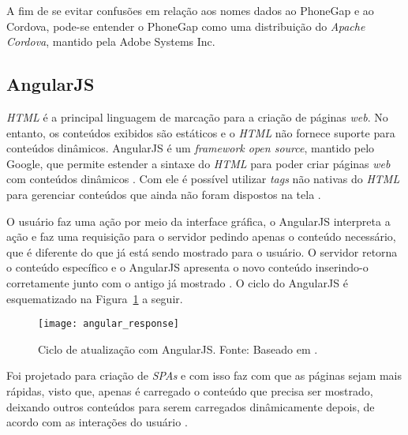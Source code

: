 A fim de se evitar confusões em relação aos nomes dados ao PhoneGap e ao Cordova, pode-se entender o PhoneGap 
como uma distribuição do \textit{Apache Cordova}, mantido pela Adobe Systems Inc. 



\subsection{AngularJS} \label{subsection:angularjs}

\textit{HTML} é a principal linguagem de marcação para a criação de páginas \textit{web}. No entanto, os conteúdos 
exibidos são estáticos e o \textit{HTML} não fornece suporte para conteúdos dinâmicos.
AngularJS é um \textit{framework open source}, mantido pelo Google, que permite estender a sintaxe do 
\textit{HTML} para poder criar páginas \textit{web} com conteúdos dinâmicos \cite{bezerra_desenvolvimento_2016}. Com ele é possível utilizar \textit{tags} 
não nativas do \textit{HTML} para gerenciar conteúdos que ainda não 
foram dispostos na tela \cite{google_angularjs_2016}.

O usuário faz uma ação por meio da interface gráfica, 
o AngularJS interpreta a ação e faz uma requisição para o servidor pedindo apenas o conteúdo necessário, que é 
diferente do que já está sendo mostrado para o usuário. 
O servidor retorna o conteúdo específico e o AngularJS apresenta o novo conteúdo inserindo-o corretamente junto 
com o antigo já mostrado \cite{ursino_angularjs:_2015}. O ciclo do AngularJS é esquematizado na Figura~\ref{fig:angular_response} a seguir.

\begin{figure}[h]
  \centering
    \texttt{[image: angular\_response]}
    \caption[Ciclo de atualização com AngularJS]{ Ciclo de atualização com AngularJS. Fonte: Baseado em \cite{ursino_angularjs:_2015}.}
	\label{fig:angular_response}
\end{figure}

Foi projetado para criação de \textit{SPAs} e com isso faz com que as páginas sejam mais rápidas, visto que, apenas é carregado o conteúdo que precisa ser mostrado, 
deixando outros conteúdos para serem carregados dinâmicamente depois, de acordo com as interações do usuário \cite{rodriguez_diseno_2015}.

